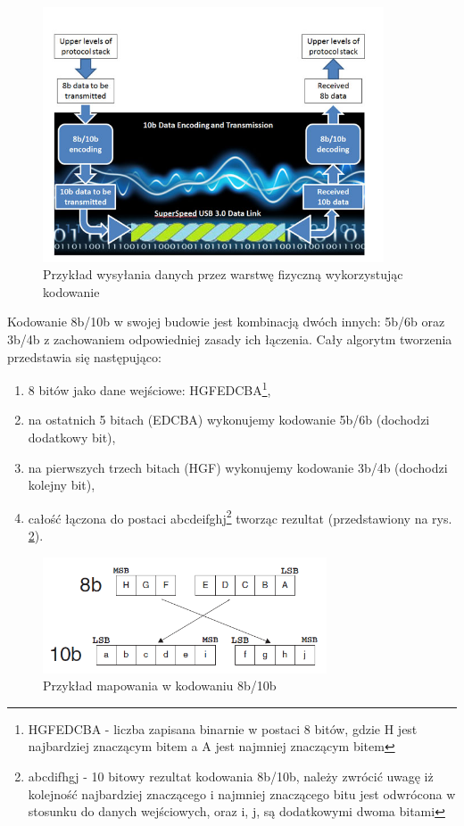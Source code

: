 \documentclass{BscUS}
\begin{document}
\begin{figure}[H]
\centering
\includegraphics[width=0.9\textwidth]{./img/SendingData}
\caption{Przykład wysyłania danych przez warstwę fizyczną wykorzystując kodowanie \cite{SendingData}}
\label{fig:sendingDataThroughPHYLayer}
\end{figure}
\indent Kodowanie 8b/10b w swojej budowie jest kombinacją dwóch innych: 5b/6b oraz 3b/4b z zachowaniem odpowiedniej zasady ich łączenia. Cały algorytm tworzenia przedstawia się następująco:
\begin{enumerate}
\item 8 bitów jako dane wejściowe: HGFEDCBA\footnote{HGFEDCBA - liczba zapisana binarnie w postaci 8 bitów, gdzie H jest najbardziej znaczącym bitem a A jest najmniej znaczącym bitem},
\item na ostatnich 5 bitach (EDCBA) wykonujemy kodowanie 5b/6b (dochodzi dodatkowy bit),
\item na pierwszych trzech bitach (HGF) wykonujemy kodowanie 3b/4b (dochodzi kolejny bit),
\item całość łączona do postaci abcdeifghj\footnote{abcdifhgj - 10 bitowy rezultat kodowania 8b/10b, należy zwrócić uwagę iż kolejność najbardziej znaczącego i najmniej znaczącego bitu jest odwrócona w stosunku do danych wejściowych, oraz i, j, są dodatkowymi dwoma bitami} tworząc rezultat (przedstawiony na rys. \ref{fig:810mapping}).
\end{enumerate}
\begin{figure}[H]
\centering
\includegraphics[width=0.75\textwidth]{./img/mapping810}
\caption{Przykład mapowania w kodowaniu 8b/10b \cite{mapping810}}
\label{fig:810mapping}
\end{figure}
\end{document}
